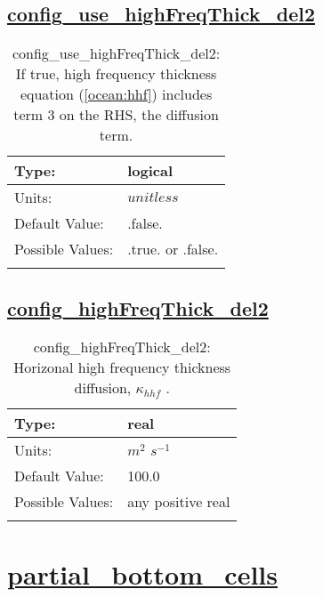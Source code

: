 \subsection[config\_use\_highFreqThick\_del2]{\hyperref[sec:nm_tab_ALE_frequency_filtered_thickness]{config\_use\_highFreqThick\_del2}}
\label{subsec:nm_sec_config_use_highFreqThick_del2}
\begin{center}
\begin{longtable}{| p{2.0in} | p{4.0in} |}
    \hline
    Type: & logical \\
    \hline
    Units: & $unitless$ \\
    \hline
    Default Value: & .false. \\
    \hline
    Possible Values: & .true. or .false. \\
    \hline
    \caption{config\_use\_highFreqThick\_del2: If true, high frequency thickness equation (\ref{ocean:hhf}) includes term 3 on the RHS, the diffusion term.}
\end{longtable}
\end{center}
\subsection[config\_highFreqThick\_del2]{\hyperref[sec:nm_tab_ALE_frequency_filtered_thickness]{config\_highFreqThick\_del2}}
\label{subsec:nm_sec_config_highFreqThick_del2}
\begin{center}
\begin{longtable}{| p{2.0in} | p{4.0in} |}
    \hline
    Type: & real \\
    \hline
    Units: & $m^2$ $s^{-1}$ \\
    \hline
    Default Value: & 100.0 \\
    \hline
    Possible Values: & any positive real \\
    \hline
    \caption{config\_highFreqThick\_del2:  Horizonal high frequency thickness diffusion,  $\kappa_{hhf}$ .}
\end{longtable}
\end{center}
\section[partial\_bottom\_cells]{\hyperref[sec:nm_tab_partial_bottom_cells]{partial\_bottom\_cells}}
\label{sec:nm_sec_partial_bottom_cells}
